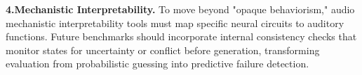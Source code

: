 \documentclass{llmxive}
\providecommand{\cmark}{\ding{51}}
\providecommand{\xmark}{\ding{55}}
\providecommand{\arraystretch}{1.3}
\begin{document}
\textbf{4.Mechanistic Interpretability.} To move beyond "opaque behaviorism," audio mechanistic interpretability tools must map specific neural circuits to auditory functions. Future benchmarks should incorporate internal consistency checks that monitor states for uncertainty or conflict before generation, transforming evaluation from probabilistic guessing into predictive failure detection.


\end{document}
